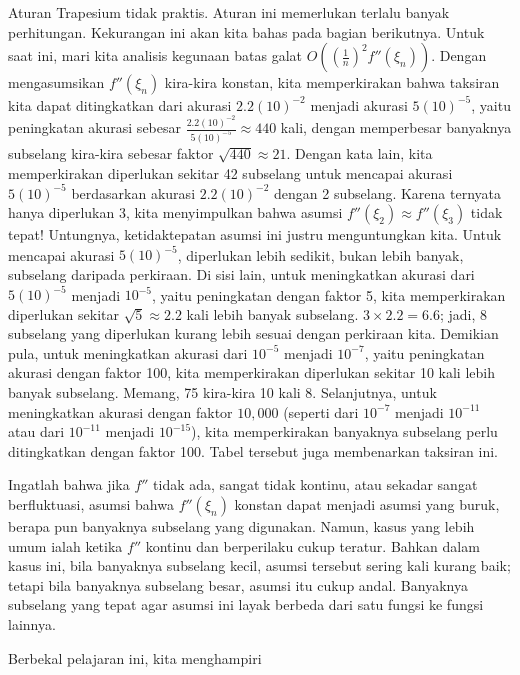 \noindent Aturan Trapesium tidak praktis. Aturan ini memerlukan terlalu
banyak perhitungan. Kekurangan ini akan kita bahas pada bagian berikutnya.
Untuk saat ini, mari kita analisis kegunaan batas galat $O\left(\left(\frac{1}{n}\right)^{2}f''(\xi_{n})\right)$.
Dengan mengasumsikan $f''(\xi_{n})$ kira-kira konstan, kita memperkirakan
bahwa taksiran kita dapat ditingkatkan dari akurasi $2.2(10)^{-2}$
menjadi akurasi $5(10)^{-5}$, yaitu peningkatan akurasi sebesar $\frac{2.2(10)^{-2}}{5(10)^{-5}}\approx440$
kali, dengan memperbesar banyaknya subselang kira-kira sebesar faktor
$\sqrt{440}\approx21$. Dengan kata lain, kita memperkirakan diperlukan
sekitar 42 subselang untuk mencapai akurasi $5(10)^{-5}$ berdasarkan
akurasi $2.2(10)^{-2}$ dengan 2 subselang. Karena ternyata hanya
diperlukan 3, kita menyimpulkan bahwa asumsi $f''(\xi_{2})\approx f''(\xi_{3})$
tidak tepat! Untungnya, ketidaktepatan asumsi ini justru menguntungkan
kita. Untuk mencapai akurasi $5(10)^{-5}$, diperlukan lebih sedikit,
bukan lebih banyak, subselang daripada perkiraan. Di sisi lain, untuk
meningkatkan akurasi dari $5(10)^{-5}$ menjadi $10^{-5}$, yaitu
peningkatan dengan faktor 5, kita memperkirakan diperlukan sekitar
$\sqrt{5}\approx2.2$ kali lebih banyak subselang. $3\times2.2=6.6$;
jadi, 8 subselang yang diperlukan kurang lebih sesuai dengan perkiraan
kita. Demikian pula, untuk meningkatkan akurasi dari $10^{-5}$ menjadi
$10^{-7}$, yaitu peningkatan akurasi dengan faktor 100, kita memperkirakan
diperlukan sekitar 10 kali lebih banyak subselang. Memang, 75 kira-kira
10 kali 8. Selanjutnya, untuk meningkatkan akurasi dengan faktor $10,000$
(seperti dari $10^{-7}$ menjadi $10^{-11}$ atau dari $10^{-11}$
menjadi $10^{-15}$), kita memperkirakan banyaknya subselang perlu
ditingkatkan dengan faktor 100. Tabel tersebut juga membenarkan taksiran
ini.

Ingatlah bahwa jika $f''$ tidak ada, sangat tidak kontinu, atau sekadar
sangat berfluktuasi, asumsi bahwa $f''(\xi_{n})$ konstan dapat menjadi
asumsi yang buruk, berapa pun banyaknya subselang yang digunakan.
Namun, kasus yang lebih umum ialah ketika $f''$ kontinu dan berperilaku
cukup teratur. Bahkan dalam kasus ini, bila banyaknya subselang kecil,
asumsi tersebut sering kali kurang baik; tetapi bila banyaknya subselang
besar, asumsi itu cukup andal. Banyaknya subselang yang tepat agar
asumsi ini layak berbeda dari satu fungsi ke fungsi lainnya. 

Berbekal pelajaran ini, kita menghampiri

